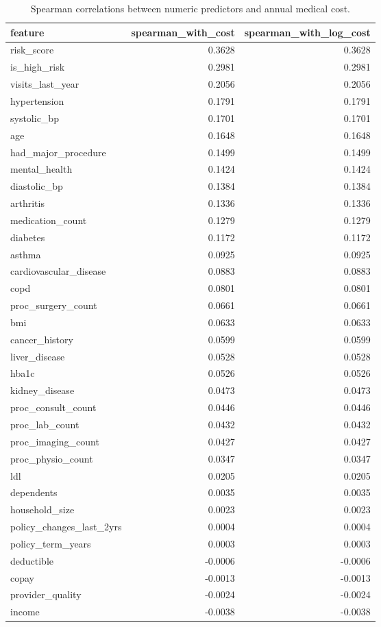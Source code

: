 \begin{table}
\caption{Spearman correlations between numeric predictors and annual medical cost.}
\label{tab:02-numeric-spearman-correlations}
\begin{tabular}{lrr}
\toprule
feature & spearman_with_cost & spearman_with_log_cost \\
\midrule
risk_score & 0.3628 & 0.3628 \\
is_high_risk & 0.2981 & 0.2981 \\
visits_last_year & 0.2056 & 0.2056 \\
hypertension & 0.1791 & 0.1791 \\
systolic_bp & 0.1701 & 0.1701 \\
age & 0.1648 & 0.1648 \\
had_major_procedure & 0.1499 & 0.1499 \\
mental_health & 0.1424 & 0.1424 \\
diastolic_bp & 0.1384 & 0.1384 \\
arthritis & 0.1336 & 0.1336 \\
medication_count & 0.1279 & 0.1279 \\
diabetes & 0.1172 & 0.1172 \\
asthma & 0.0925 & 0.0925 \\
cardiovascular_disease & 0.0883 & 0.0883 \\
copd & 0.0801 & 0.0801 \\
proc_surgery_count & 0.0661 & 0.0661 \\
bmi & 0.0633 & 0.0633 \\
cancer_history & 0.0599 & 0.0599 \\
liver_disease & 0.0528 & 0.0528 \\
hba1c & 0.0526 & 0.0526 \\
kidney_disease & 0.0473 & 0.0473 \\
proc_consult_count & 0.0446 & 0.0446 \\
proc_lab_count & 0.0432 & 0.0432 \\
proc_imaging_count & 0.0427 & 0.0427 \\
proc_physio_count & 0.0347 & 0.0347 \\
ldl & 0.0205 & 0.0205 \\
dependents & 0.0035 & 0.0035 \\
household_size & 0.0023 & 0.0023 \\
policy_changes_last_2yrs & 0.0004 & 0.0004 \\
policy_term_years & 0.0003 & 0.0003 \\
deductible & -0.0006 & -0.0006 \\
copay & -0.0013 & -0.0013 \\
provider_quality & -0.0024 & -0.0024 \\
income & -0.0038 & -0.0038 \\
\bottomrule
\end{tabular}
\end{table}
